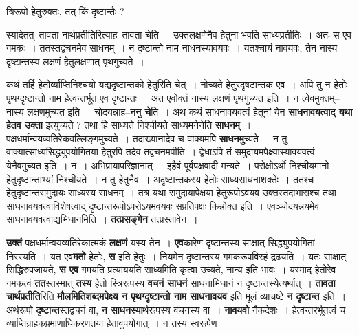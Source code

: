 \documentclass[article,12pt,a4paper]{memoir}
\begin{document}
	त्रिरूपो हेतुरुक्तः, तत् किं दृष्टान्तैः ?  
	  
	स्यादेतत्--तावता नार्थप्रतीतिरित्याह--तावता चेति । उक्तलक्षणेनैव हेतुना भवति साध्यप्रतीतिः । अतः स एव गमकः । ततस्तद्वचनमेव साधनम् । न दृष्टान्तो नाम नाधनस्यावयवः । यतश्चायं नावयवः, तेन नास्य दृष्टान्तस्य लक्षणं हेतुलक्षणात् पृथगुच्यते ।  
	  
	कथं तर्हि हेतोर्व्याप्तिनिश्चयो यद्यदृष्टान्तको हेतुरिति चेत् । नोच्यते हेतुरदृषटान्तक एव । अपि तु न हेतोः पृथग्दृष्टान्तो नाम हेत्वन्तर्भूत एव दृष्टान्तः । अत एवोक्तं नास्य लक्षणं पृथगुच्यत इति । न त्वेवमुक्तम्--नास्य लक्षणमुच्यत इति । चोदयन्नाह--\textbf{ननु चे}ति । अथ कथं साधनावयवत्वं हेतूनां येन \textbf{साधनावयत्वाद् यथा हेतव उक्ता} इत्युच्यते ? तथा हि साध्यते निश्चीयते साध्यमनेनेति \textbf{साधनम्} । पक्षधर्मान्वयव्यतिरेकवल्लिङ्गमुच्यते । तदाख्यानादेव च वाक्यमपि \textbf{साधनमु}च्यते । न तु वाक्यात्साध्यसिद्ध्युपयोगितया हेतुरपि तदेव तद्वचनमपीति । द्वेधाऽपि तं समुदायमपेक्ष्यास्यावयवत्वं येनैवमुच्यत इति । न । अभिप्रायापरिज्ञानात् । इहैवं पूर्वपक्षवादी मन्यते । परोक्षोऽर्थो निश्चीयमानो हेतुदृष्टान्ताभ्यां निश्चीयते । न तु हेतुनैव । अदृष्टान्तकस्य हेतोः साध्यसाधनाशक्तेः । ततश्च हेतुदृष्टान्तसमुदायः साध्यस्य साधनम् । तत्र यथा समुदायापेक्षया हेतुरूपोऽवयव उक्तस्तदाभासश्च तथा साधनावयवत्वाविशेषत्वाद् दृष्टान्तरूपोऽपरोऽयमवयवः सप्रतिपक्षः किन्नोक्त इति । एवञ्चोदयन्नयमेव साधनावयवत्वाद्यभिधानमिति । \textbf{तत्प्रसङ्गेन} तत्प्रस्तावेन ।
	\pend
      

	  \pstart \textbf{उक्तं} पक्षधर्मान्वयव्यतिरेकात्मकं \textbf{लक्षणं} यस्य तेन । \textbf{एव}कारेण दृष्टान्तस्य साक्षात् सिद्ध्युपयोगितां निरस्यति । यत एव\textbf{मतो} हेतोः, \textbf{स} इति हेतुः । नियमेन दृष्टान्तस्य गमकरूपविरहं द्रढयति । यतः साक्षात् सिद्धिरुपजायते, \textbf{स एव} गमयति प्रत्याययति साध्यमिति कृत्वा उच्यते, नान्य इति भावः । यस्माद् हेतोरेव गमकत्वं \textbf{तत}स्तस्मात् \textbf{तस्य} हेतो स्त्रिरूपस्य \textbf{वचनं साधनं} साधनाभिधानं न दृष्टान्तस्येत्यर्थात् । \textbf{तावता चार्थप्रतीति}रिति \textbf{मौलमितिशब्दमपेक्ष्य न पृथग्दृष्टान्तो नाम साधनावयव} इति मूलं व्याचष्टे \textbf{न दृष्टान्त} इति । अर्थरूपो \textbf{दृष्टान्त}स्तद्वचनं वा, \textbf{न साधनस्या}र्थरूपस्य वचनस्य वा । \textbf{नावयवो} नैकदेशः । हेत्वन्तरर्भूतत्वं च व्याप्तिग्राहकप्रमाणाधिकरणतया हेतावुपयोगात् । न तस्य स्वरू\leavevmode{}पेण  \leavevmode{} 
	  
\end{document}
